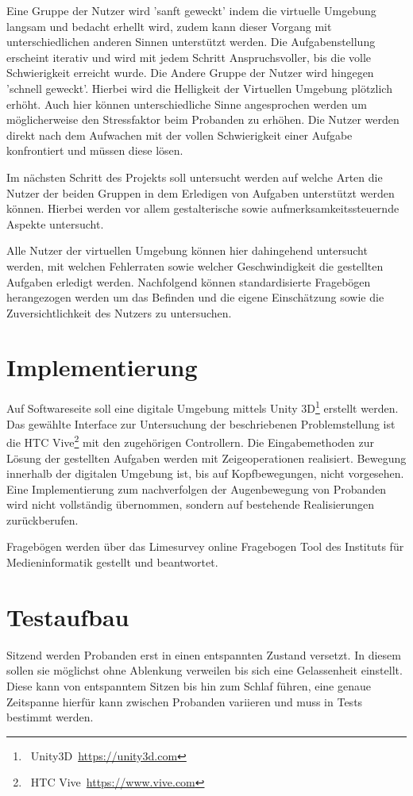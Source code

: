 \documentclass[a4paper, 11pt]{article}
\begin{document}
Eine Gruppe der Nutzer wird 'sanft geweckt' indem die virtuelle Umgebung langsam und bedacht erhellt wird, zudem kann dieser Vorgang mit unterschiedlichen anderen Sinnen unterstützt werden. Die Aufgabenstellung erscheint iterativ und wird mit jedem Schritt Anspruchsvoller, bis die volle Schwierigkeit erreicht wurde. 
Die Andere Gruppe der Nutzer wird hingegen 'schnell geweckt'. Hierbei wird die Helligkeit der Virtuellen Umgebung plötzlich erhöht. Auch hier können unterschiedliche Sinne angesprochen werden um möglicherweise den Stressfaktor beim Probanden zu erhöhen. Die Nutzer werden direkt nach dem Aufwachen mit der vollen Schwierigkeit einer Aufgabe konfrontiert und müssen diese lösen.


Im nächsten Schritt des Projekts soll untersucht werden auf welche Arten die Nutzer der beiden Gruppen in dem Erledigen von Aufgaben unterstützt werden können. Hierbei werden vor allem gestalterische sowie aufmerksamkeitssteuernde Aspekte untersucht. 

Alle Nutzer der virtuellen Umgebung können hier dahingehend untersucht werden, mit welchen Fehlerraten sowie welcher Geschwindigkeit die gestellten Aufgaben erledigt werden. Nachfolgend können standardisierte Fragebögen herangezogen werden um das Befinden und die eigene Einschätzung sowie die Zuversichtlichkeit des Nutzers zu untersuchen.

\section*{Implementierung}
Auf Softwareseite soll eine digitale Umgebung mittels Unity 3D\footnote{~Unity3D~\url{https://unity3d.com}} erstellt werden. Das gewählte Interface zur Untersuchung der beschriebenen Problemstellung ist die HTC Vive\footnote{~HTC Vive~\url{https://www.vive.com}} mit den zugehörigen Controllern. Die Eingabemethoden zur Lösung der gestellten Aufgaben werden mit Zeigeoperationen realisiert. Bewegung innerhalb der digitalen Umgebung ist, bis auf Kopfbewegungen, nicht vorgesehen. Eine Implementierung zum nachverfolgen der Augenbewegung von Probanden wird nicht vollständig übernommen, sondern auf bestehende Realisierungen zurückberufen.

Fragebögen werden über das Limesurvey online Fragebogen Tool des Instituts für Medieninformatik gestellt und beantwortet. 

\section*{Testaufbau}
Sitzend werden Probanden erst in einen entspannten Zustand versetzt. In diesem sollen sie möglichst ohne Ablenkung verweilen bis sich eine Gelassenheit einstellt. Diese kann von entspanntem Sitzen bis hin zum Schlaf führen, eine genaue Zeitspanne hierfür kann zwischen Probanden variieren und muss in Tests bestimmt werden.
\end{document}
